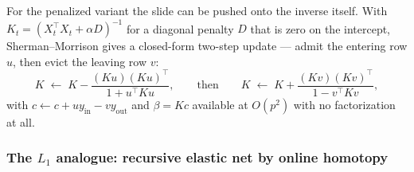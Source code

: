 For the penalized variant the slide can be pushed onto the inverse itself. With
$K_t = (X_t^\top X_t + \alpha D)^{-1}$ for a diagonal penalty $D$ that is zero on
the intercept, Sherman--Morrison gives a closed-form two-step update --- admit the
entering row $u$, then evict the leaving row $v$:
\begin{equation}
K \;\leftarrow\; K - \frac{(Ku)(Ku)^\top}{1 + u^\top K u},
\qquad\text{then}\qquad
K \;\leftarrow\; K + \frac{(Kv)(Kv)^\top}{1 - v^\top K v},
\label{eq:sherman_morrison}
\end{equation}
with $c \leftarrow c + u y_{\mathrm{in}} - v y_{\mathrm{out}}$ and $\beta = Kc$
available at $O(p^2)$ with no factorization at all.

\subsubsection{The \texorpdfstring{$L_1$}{L1} analogue: recursive elastic net by online homotopy}
\label{sec:alg_homotopy}

